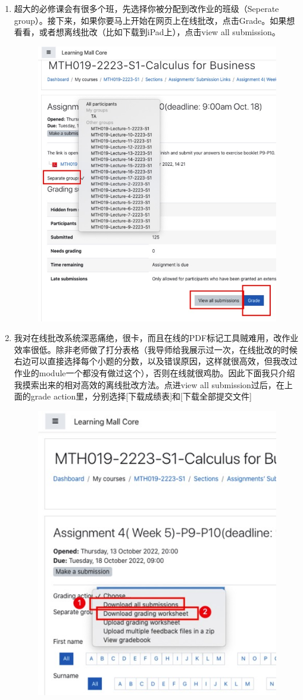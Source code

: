 \begin{enumerate}
    \item 超大的必修课会有很多个班，先选择你被分配到改作业的班级（Seperate group）。接下来，如果你要马上开始在网页上在线批改，点击Grade。如果想看看，或者想离线批改（比如下载到iPad上），点击view all submission。
        \begin{figure}[H]
            \centering
            \includegraphics[width=0.5\columnwidth]{author-folder/Kai.Wu/LMO_inside_submission.jpg}
        \end{figure}
    \item 我对在线批改系统深恶痛绝，很卡，而且在线的PDF标记工具贼难用，改作业效率很低。除非老师做了打分表格（我导师给我展示过一次，在线批改的时候右边可以直接选择每个小题的分数，以及错误原因，这样就很高效，但我改过作业的module一个都没有做过这个），否则在线就很鸡肋。因此下面我只介绍我摸索出来的相对高效的离线批改方法。点进view all submission过后，在上面的grade action里，分别选择[下载成绩表]和[下载全部提交文件]
        \begin{figure}[H]
            \centering
            \includegraphics[width=0.5\columnwidth]{author-folder/Kai.Wu/LMO_download.jpg}

\end{figure}
\end{enumerate}
